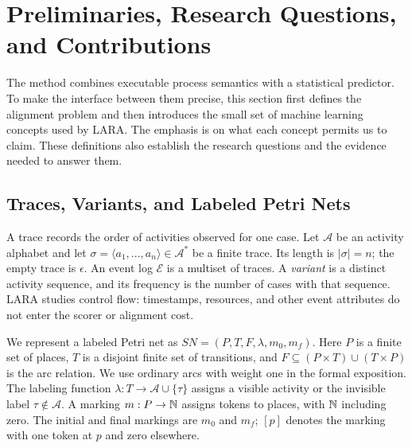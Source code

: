 \section{Preliminaries, Research Questions, and Contributions}
\label{sec:preliminaries}

The method combines executable process semantics with a statistical predictor. To make the interface between them precise, this section first defines the alignment problem and then introduces the small set of machine learning concepts used by LARA. The emphasis is on what each concept permits us to claim. These definitions also establish the research questions and the evidence needed to answer them.

\subsection{Traces, Variants, and Labeled Petri Nets}

A trace records the order of activities observed for one case. Let $\mathcal A$ be an activity alphabet and let $\sigma=\langle a_1,\ldots,a_n\rangle\in\mathcal A^*$ be a finite trace. Its length is $|\sigma|=n$; the empty trace is $\epsilon$. An event log $\mathcal E$ is a multiset of traces. A \emph{variant} is a distinct activity sequence, and its frequency is the number of cases with that sequence. LARA studies control flow: timestamps, resources, and other event attributes do not enter the scorer or alignment cost.

We represent a labeled Petri net as $SN=(P,T,F,\lambda,m_0,m_f)$. Here $P$ is a finite set of places, $T$ is a disjoint finite set of transitions, and $F\subseteq(P\times T)\cup(T\times P)$ is the arc relation. We use ordinary arcs with weight one in the formal exposition. The labeling function $\lambda:T\to\mathcal A\cup\{\tau\}$ assigns a visible activity or the invisible label $\tau\notin\mathcal A$. A marking $m:P\to\mathbb{N}$ assigns tokens to places, with $\mathbb{N}$ including zero. The initial and final markings are $m_0$ and $m_f$; $[p]$ denotes the marking with one token at $p$ and zero elsewhere.


